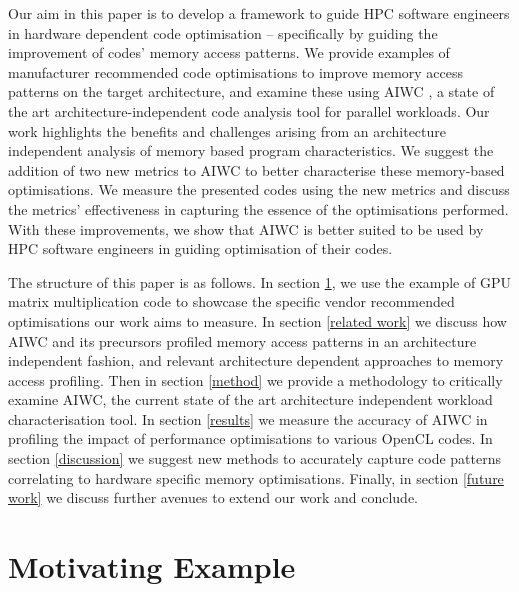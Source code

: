 \documentclass[review=false, sigchi]{acmart}
\begin{document}
	
	
	Our aim in this paper is to develop a framework to guide HPC software engineers in hardware dependent code optimisation -- specifically by guiding the improvement of codes' memory access patterns. We provide examples of manufacturer recommended code optimisations to improve memory access patterns on the target architecture, and examine these using AIWC \cite{beauaiwc}, a state of the art architecture-independent code analysis tool for parallel workloads. Our work highlights the benefits and challenges arising from an architecture independent analysis of memory based program characteristics. We suggest the addition of two new metrics to AIWC to better characterise these memory-based optimisations. We measure the presented codes using the new metrics and discuss the metrics' effectiveness in capturing the essence of the optimisations performed. With these improvements, we show that AIWC is better suited to be used by HPC software engineers in guiding optimisation of their codes. 
	
	The structure of this paper is as follows. In section \ref{motivating example}, we use the example of GPU matrix multiplication code to showcase the specific vendor recommended optimisations our work aims to measure. In section \ref{related work} we discuss how AIWC and its precursors profiled memory access patterns in an architecture independent fashion, and relevant architecture dependent approaches to memory access profiling. Then in section \ref{method} we provide a methodology to critically examine AIWC, the current state of the art architecture independent workload characterisation tool. In section \ref{results} we measure the accuracy of AIWC in profiling the impact of performance optimisations to various OpenCL codes. In section \ref{discussion} we suggest new methods to accurately capture code patterns correlating to hardware specific memory optimisations. Finally, in section \ref{future work} we discuss further avenues to extend our work and conclude.
	
	\section{Motivating Example} \label{motivating example}
	
\end{document}
